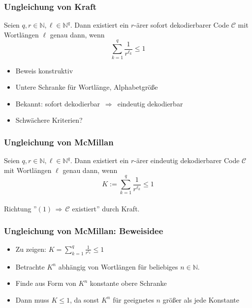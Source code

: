 \documentclass{beamer}
\begin{document}
\begin{frame}[t]
    \frametitle{Ungleichung von Kraft}
    Seien $q,r \in \mathbb{N}, \ell \in \mathbb{N}^q$. Dann existiert ein $r$-ärer sofort dekodierbarer Code $\mathcal{C}$
    mit Wortlängen $\ell$ genau dann, wenn
    $$
        \sum_{k=1}^{q} \frac{1}{r^{\ell_k}} \leq 1
    $$
    \begin{itemize}
        \setlength\itemsep{1em}
        \item Beweis konstruktiv
        \item Untere Schranke für Wortlänge, Alphabetgröße
        \setlength\itemsep{3em}
        \pause
        \item Bekannt: sofort dekodierbar $\,\Longrightarrow\,$ eindeutig dekodierbar
        \setlength\itemsep{1em}
        \item Schwächere Kriterien?
    \end{itemize}
\end{frame}

\begin{frame}[t]
    \frametitle{Ungleichung von McMillan}
    Seien $q,r \in \mathbb{N}, \ell \in \mathbb{N}^q$.
    Dann existiert ein $r$-ärer {\color{red}eindeutig dekodierbarer} Code $\mathcal{C}$
    mit Wortlängen $\ell$ genau dann, wenn
    \begin{equation}
        K := \sum_{k=1}^{q} \frac{1}{r^{\ell_k}} \leq 1
    \end{equation}\\[20pt]

    Richtung ''$(1) \,\Longrightarrow\, \mathcal{C}$ existiert'' durch Kraft.\\
\end{frame}

\begin{frame}[t]
    \frametitle{Ungleichung von McMillan: Beweisidee}
    \begin{itemize}
        \setlength\itemsep{1.3em}
        \item Zu zeigen: $K = \sum_{k=1}^{q} \frac{1}{r^{\ell_k}} \leq 1$
        \item Betrachte $K^n$ abhängig von Wortlängen für beliebiges $n \in \mathbb{N}$.
        \item Finde aus Form von $K^n$ konstante obere Schranke
        \item Dann muss $K \leq 1$, da sonst $K^n$ für geeignetes $n$ größer
            als jede Konstante
    \end{itemize}
\end{frame}
\end{document}
